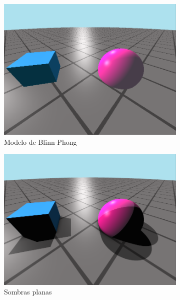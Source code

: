 \begin{figure}[ht!]
\begin{subfigure}[b]{0.3\textwidth}
        \centering
        \includegraphics[width=\textwidth]{Plantilla-TFG-master/img/escena3_blinnPhong.png}
        \caption{Modelo de Blinn-Phong}
    \end{subfigure}
    \medskip
    \begin{subfigure}[b]{0.3\textwidth}
        \centering
        \includegraphics[width=\textwidth]{Plantilla-TFG-master/img/escena4_sombraPlana.png}
        \caption{Sombras planas}
    \end{subfigure}
    \hfill
    \begin{subfigure}[b]{0.3\textwidth}
        \centering

\end{subfigure}
\end{figure}
